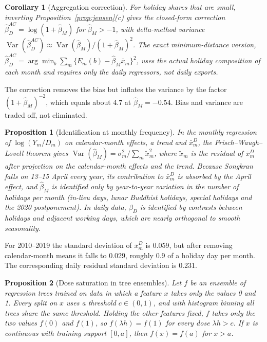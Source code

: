 \documentclass{article}
\theoremstyle{plain}
\newtheorem{proposition}{Proposition}
\newtheorem{corollary}{Corollary}
\theoremstyle{definition}
\theoremstyle{remark}
\begin{document}
\begin{corollary}[Aggregation correction]\label{cor:ac}
For holiday shares that are small, inverting Proposition~\ref{prop:jensen}(c) gives the closed-form correction $\hat\beta_D^{AC}=\log(1+\hat\beta_M)$ for $\hat\beta_M>-1$, with delta-method variance $\operatorname{Var}(\hat\beta_D^{AC})\approx\operatorname{Var}(\hat\beta_M)/(1+\hat\beta_M)^2$. The exact minimum-distance version, $\hat\beta_D^{AC}=\arg\min_b\sum_m\{E_m(b)-\hat\beta_M\bar x_m\}^2$, uses the actual holiday composition of each month and requires only the daily regressors, not daily exports.
\end{corollary}

The correction removes the bias but inflates the variance by the factor $(1+\hat\beta_M)^{-2}$, which equals about 4.7 at $\hat\beta_M=-0.54$. Bias and variance are traded off, not eliminated.

\begin{proposition}[Identification at monthly frequency]\label{prop:ident}
In the monthly regression of $\log(Y_m/D_m)$ on calendar-month effects, a trend and $\bar x^D_m$, the Frisch--Waugh--Lovell theorem gives $\operatorname{Var}(\hat\beta_M)=\sigma_m^2/\sum_m\tilde x_m^2$, where $\tilde x_m$ is the residual of $\bar x^D_m$ after projection on the calendar-month effects and the trend. Because Songkran falls on 13--15 April every year, its contribution to $\bar x^D_m$ is absorbed by the April effect, and $\hat\beta_M$ is identified only by year-to-year variation in the number of holidays per month (in-lieu days, lunar Buddhist holidays, special holidays and the 2020 postponement). In daily data, $\beta_D$ is identified by contrasts between holidays and adjacent working days, which are nearly orthogonal to smooth seasonality.
\end{proposition}

For 2010--2019 the standard deviation of $\bar x^D_m$ is 0.059, but after removing calendar-month means it falls to 0.029, roughly 0.9 of a holiday day per month. The corresponding daily residual standard deviation is 0.231.

\begin{proposition}[Dose saturation in tree ensembles]\label{prop:tree}
Let $f$ be an ensemble of regression trees trained on data in which a feature $x$ takes only the values 0 and 1. Every split on $x$ uses a threshold $c\in(0,1)$, and with histogram binning all trees share the same threshold. Holding the other features fixed, $f$ takes only the two values $f(0)$ and $f(1)$, so $f(\lambda h)=f(1)$ for every dose $\lambda h>c$. If $x$ is continuous with training support $[0,a]$, then $f(x)=f(a)$ for $x>a$.
\end{proposition}
\end{document}
